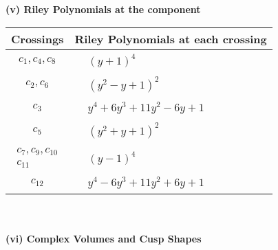 \documentclass[1p]{elsarticle_modified}
\theoremstyle{definition}
\begin{document}
\newpage\renewcommand{\arraystretch}{1}
\flushleft \textbf{(v) Riley Polynomials at the component}\newline \\
\begin{tabular}{m{50pt}|m{274pt}}
Crossings & \hspace{64pt}Riley Polynomials at each crossing \\
\hline $$\begin{aligned}c_{1},c_{4},c_{8}\end{aligned}$$&$\begin{aligned}
&(y+1)^4
\end{aligned}$\\
\hline $$\begin{aligned}c_{2},c_{6}\end{aligned}$$&$\begin{aligned}
&(y^2- y+1)^2
\end{aligned}$\\
\hline $$\begin{aligned}c_{3}\end{aligned}$$&$\begin{aligned}
&y^4+6 y^3+11 y^2-6 y+1
\end{aligned}$\\
\hline $$\begin{aligned}c_{5}\end{aligned}$$&$\begin{aligned}
&(y^2+y+1)^2
\end{aligned}$\\
\hline $$\begin{aligned}c_{7},c_{9},c_{10}\\c_{11}\end{aligned}$$&$\begin{aligned}
&(y-1)^4
\end{aligned}$\\
\hline $$\begin{aligned}c_{12}\end{aligned}$$&$\begin{aligned}
&y^4-6 y^3+11 y^2+6 y+1
\end{aligned}$\\
\hline
\end{tabular}\\~\\
\newpage\flushleft \textbf{(vi) Complex Volumes and Cusp Shapes}
\end{document}
